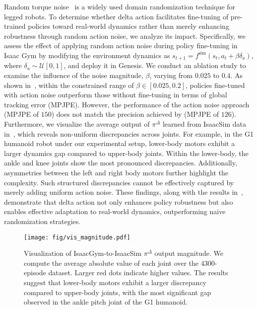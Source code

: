 Random torque noise~\cite{rfi} is a widely used domain randomization technique for legged robots. To determine whether delta action facilitates fine-tuning of pre-trained policies toward real-world dynamics rather than merely enhancing robustness through random action noise, we analyze its impact. Specifically, we assess the effect of applying random action noise during policy fine-tuning in Isaac Gym by modifying the environment dynamics as $s_{t+1} = f^\text{sim}(s_t, a_t + \beta \delta_a)$, where $\delta_a \sim \mathcal{U}[0, 1]$, and deploy it in Genesis. We conduct an ablation study to examine the influence of the noise magnitude, $\beta$, varying from $0.025$ to $0.4$. As shown in~, within the constrained range of $\beta \in [0.025, 0.2]$, policies fine-tuned with action noise outperform those without fine-tuning in terms of global tracking error (MPJPE). However, the performance of the action noise approach (MPJPE of $150$) does not match the precision achieved by \method (MPJPE of $126$). Furthermore, we visualize the average output of $\pi^\Delta$ learned from IsaacSim data in~, which reveals non-uniform discrepancies across joints. For example, in the G1 humanoid robot under our experimental setup, lower-body motors exhibit a larger dynamics gap compared to upper-body joints. Within the lower-body, the ankle and knee joints show the most pronounced discrepancies. Additionally, asymmetries between the left and right body motors further highlight the complexity. Such structured discrepancies cannot be effectively captured by merely adding uniform action noise.
These findings, along with the results in~, demonstrate that delta action not only enhances policy robustness but also enables effective adaptation to real-world dynamics, outperforming naive randomization strategies.

\begin{figure}[t]
    \centering
    \texttt{[image: fig/vis\_magnitude.pdf]}
    \vspace{-2mm}
    \caption{Visualization of IsaacGym-to-IsaacSim $\pi^\Delta$ output magnitude. We compute the average absolute value of each joint over the 4300-episode dataset. Larger red dots indicate higher values. The results suggest that lower-body motors exhibit a larger discrepancy compared to upper-body joints, with the most significant gap observed in the ankle pitch joint of the G1 humanoid.}
    \label{fig:vis_deltaA_magnitude}
    \vspace{-4mm}
\end{figure}

